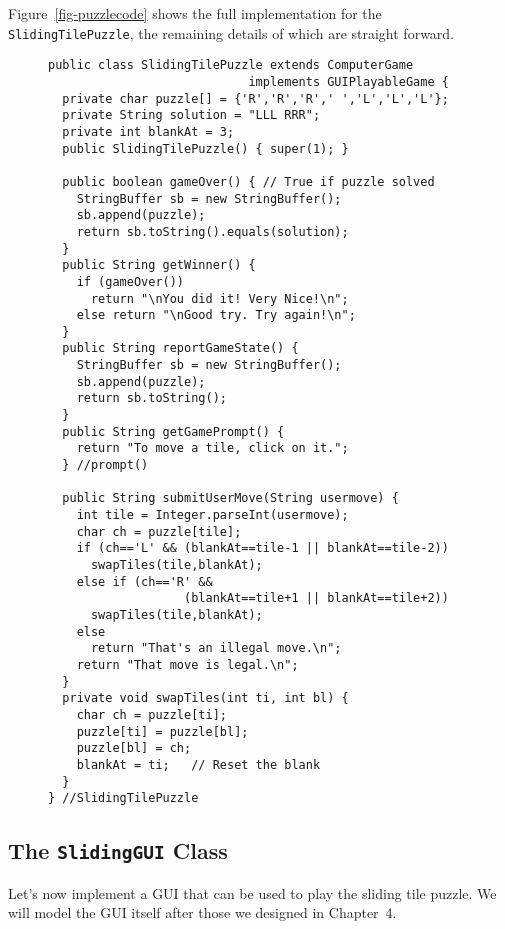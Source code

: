 Figure~\ref{fig-puzzlecode} shows the full implementation for the {\tt
SlidingTilePuzzle}, the remaining details of which are straight forward.

\begin{figure}[h!]
\jjjprogstart
\begin{jjjlisting}
\begin{lstlisting}
public class SlidingTilePuzzle extends ComputerGame 
                            implements GUIPlayableGame {
  private char puzzle[] = {'R','R','R',' ','L','L','L'};
  private String solution = "LLL RRR";
  private int blankAt = 3;
  public SlidingTilePuzzle() { super(1); }

  public boolean gameOver() { // True if puzzle solved
    StringBuffer sb = new StringBuffer();
    sb.append(puzzle);
    return sb.toString().equals(solution);    
  } 
  public String getWinner() {   
    if (gameOver())
      return "\nYou did it! Very Nice!\n";
    else return "\nGood try. Try again!\n";
  }
  public String reportGameState() {   
    StringBuffer sb = new StringBuffer();
    sb.append(puzzle);
    return sb.toString();
  } 
  public String getGamePrompt() {    
    return "To move a tile, click on it.";
  } //prompt()

  public String submitUserMove(String usermove) {   
    int tile = Integer.parseInt(usermove);
    char ch = puzzle[tile];
    if (ch=='L' && (blankAt==tile-1 || blankAt==tile-2))
      swapTiles(tile,blankAt);
    else if (ch=='R' && 
                   (blankAt==tile+1 || blankAt==tile+2))
      swapTiles(tile,blankAt);
    else 
      return "That's an illegal move.\n";
    return "That move is legal.\n";
  }
  private void swapTiles(int ti, int bl) {
    char ch = puzzle[ti];
    puzzle[ti] = puzzle[bl];
    puzzle[bl] = ch;
    blankAt = ti;   // Reset the blank
  }
} //SlidingTilePuzzle
\end{lstlisting}
\end{jjjlisting}
\end{figure}

\pagebreak
\subsection{The {\tt SlidingGUI} Class}

Let's now implement a GUI that can be used to play the sliding tile
puzzle. We will model the GUI itself after those we designed in
Chapter~4. 


